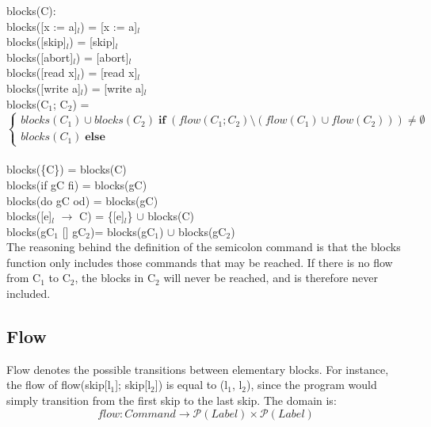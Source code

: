 \docpar
blocks(C):\\
blocks([x := a]$_l$)      = {[x := a]$_l$}\\
blocks([skip]$_l$)        = {[skip]$_l$}\\
blocks([abort]$_l$)       = {[abort]$_l$}\\
blocks([read x]$_l$)      = {[read x]$_l$}\\
blocks([write a]$_l$)     = {[write a]$_l$}\\
blocks(C$_1$; C$_2$)		 = $$
\begin{cases}
blocks(C_1) \cup blocks(C_2) \; \textbf{if} \; (flow(C_1; C_2) \setminus (flow(C_1) \cup flow(C_2))) \neq \emptyset\\
blocks(C_1) \; \textbf{else}
\end{cases}
$$\\
blocks(\{C\})             = blocks(C)\\
blocks(if gC fi)        = blocks(gC)\\
blocks(do gC od)        = blocks(gC)\\
blocks([e]$_l$ $\to$ C)      = \{[e]$_l$\} $\cup$ blocks(C)\\
blocks(gC$_1$ [] gC$_2$)= blocks(gC$_1$) $\cup$ blocks(gC$_2$)\\

\docpar
The reasoning behind the definition of the semicolon command is that the
blocks function only includes those commands that may be reached. If there is
no flow from C$_1$ to C$_2$, the blocks in C$_2$ will never be reached, and is
therefore never included.



\subsection{Flow}
Flow denotes the possible transitions between elementary blocks.
For instance, the flow of flow(skip[l$_1$]; skip[l$_2$]) is equal to
(l$_1$, l$_2$), since the program would simply transition from the first
skip to the last skip. The domain is:
\[flow \colon Command \to \mathcal{P}(Label)\times\mathcal{P}(Label)\]

